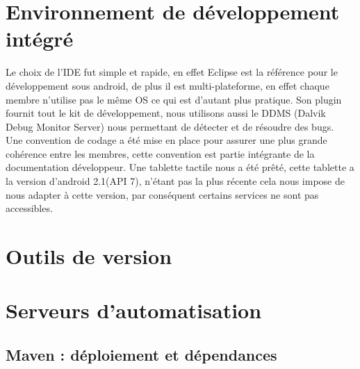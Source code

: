 \section{Environnement de développement intégré}
Le choix de l'IDE fut simple et rapide, en effet Eclipse est la référence pour le développement sous android, de plus il est multi-plateforme,
en effet chaque membre n'utilise pas le même OS ce qui est d'autant plus pratique.
Son plugin fournit tout le kit de développement, nous utilisons aussi le DDMS (Dalvik Debug Monitor Server) nous permettant de détecter et de résoudre
des bugs. \\
Une convention de codage a été mise en place pour assurer une plus grande cohérence entre les membres, cette convention est partie intégrante de la
documentation développeur.
Une tablette tactile nous a été prêté, cette tablette a la version d'android 2.1(API 7), n'étant pas la plus récente cela nous impose de nous adapter à
cette version, par conséquent certains services ne sont pas accessibles.

\section{Outils de version}

\section{Serveurs d'automatisation}

\subsection{Maven : déploiement et dépendances}

